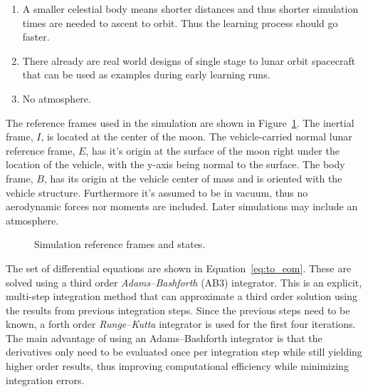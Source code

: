 \begin{enumerate}
	\item A smaller celestial body means shorter distances and thus shorter simulation times are needed to ascent to orbit. Thus the learning process should go faster.
	\item There already are real world designs of single stage to lunar orbit spacecraft that can be used as examples during early learning runs.
	\item No atmosphere.
\end{enumerate}

%         		

The reference frames used in the simulation are shown in Figure~\ref{fig:to_refframes}. The inertial frame, $I$, is located at the center of the moon.  The vehicle-carried normal lunar reference frame, $E$, has it's origin at the surface of the moon right under the location of the vehicle, with the y-axis being normal to the surface. The body frame, $B$, has its origin at the vehicle center of mass and is oriented with the vehicle structure. Furthermore it's assumed to be in vacuum, thus no aerodynamic forces nor moments are included. Later simulations may include an atmosphere.

\begin{figure}[ht]			
	\centering
				
	\caption{Simulation reference frames and states.}
	\label{fig:to_refframes}
\end{figure}

The set of differential equations are shown in Equation~\ref{eq:to_eom}. These are solved using a third order \emph{Adams–Bashforth} (AB3) integrator. This is an explicit, multi-step integration method that can approximate a third order solution using the results from previous integration steps. Since the previous steps need to be known, a forth order \emph{Runge–Kutta} integrator is used for the first four iterations. The main advantage of using an Adams–Bashforth integrator is that the derivatives only need to be evaluated once per integration step while still yielding higher order results, thus improving computational efficiency while minimizing integration errors.

